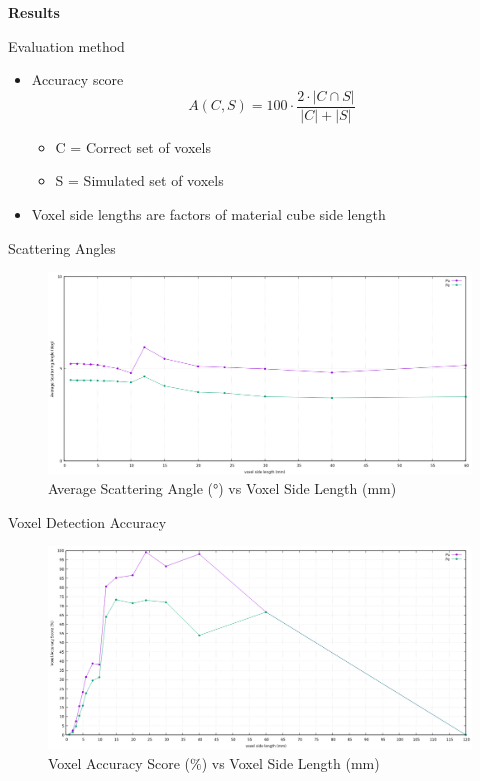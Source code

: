 \documentclass[14pt, aspectratio=169]{beamer}
\begin{document}
\begin{frame}{}
    \large \textbf{Results}
\end{frame}

\begin{frame}{Evaluation method}
    \begin{itemize}
        \item<2-> Accuracy score
        \begin{equation}
            A(C, S) = 100 \cdot \frac{2 \cdot |C \cap S|}{|C| + |S|}
        \end{equation}
        \begin{itemize}
            \item C = Correct set of voxels
            \item S = Simulated set of voxels
        \end{itemize}
        \item<3-> Voxel side lengths are factors of material cube side length
    \end{itemize}
\end{frame}

\begin{frame}{Scattering Angles}
    \begin{figure}
    \includegraphics[width=\textwidth]{images/smaller avg scattering angle vs voxel side length.png}
        \caption{Average Scattering Angle (°) vs Voxel Side Length (mm)}
    \end{figure}
\end{frame}

\begin{frame}{Voxel Detection Accuracy}
    \begin{figure}
        \includegraphics[width=\textwidth]{images/smaller voxel accuracy score vs side len.png}
            \caption{Voxel Accuracy Score (\(\%\)) vs Voxel Side Length (mm)}
    \end{figure}
\end{frame}
\end{document}

